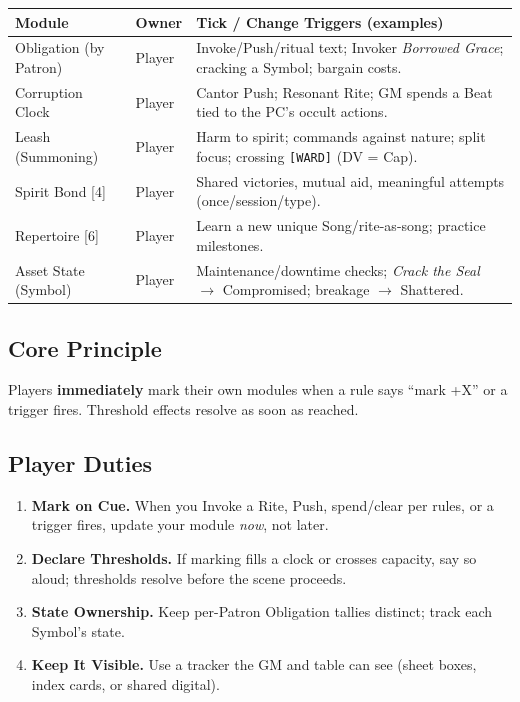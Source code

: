 \begin{tcolorbox}[colback=black!3,colframe=black!40!white,title={What Players Track (at a Glance)}]
\begin{tabularx}{\textwidth}{l l X}
\toprule
\textbf{Module} & \textbf{Owner} & \textbf{Tick / Change Triggers (examples)} \\
\midrule
Obligation (by Patron) & Player & Invoke/Push/ritual text; Invoker \emph{Borrowed Grace}; cracking a Symbol; bargain costs. \\
Corruption Clock & Player & Cantor Push; Resonant Rite; GM spends a Beat tied to the PC’s occult actions. \\
Leash (Summoning) & Player & Harm to spirit; commands against nature; split focus; crossing \texttt{[WARD]} (DV = Cap). \\
Spirit Bond [4] & Player & Shared victories, mutual aid, meaningful attempts (once/session/type). \\
Repertoire [6] & Player & Learn a new unique Song/rite-as-song; practice milestones. \\
Asset State (Symbol) & Player & Maintenance/downtime checks; \emph{Crack the Seal} \(\rightarrow\) Compromised; breakage \(\rightarrow\) Shattered. \\
\bottomrule
\end{tabularx}
\end{tcolorbox}

\subsection{Core Principle}
\label{subsec:modules-core}
Players \textbf{immediately} mark their own modules when a rule says “mark +X” or a trigger fires. Threshold effects resolve as soon as reached.

\subsection{Player Duties}
\label{subsec:player-module-duties}
\begin{enumerate}
  \item \textbf{Mark on Cue.} When you Invoke a Rite, Push, spend/clear per rules, or a trigger fires, update your module \emph{now}, not later.
  \item \textbf{Declare Thresholds.} If marking fills a clock or crosses capacity, say so aloud; thresholds resolve before the scene proceeds.
  \item \textbf{State Ownership.} Keep per-Patron Obligation tallies distinct; track each Symbol’s state.
  \item \textbf{Keep It Visible.} Use a tracker the GM and table can see (sheet boxes, index cards, or shared digital).
\end{enumerate}

